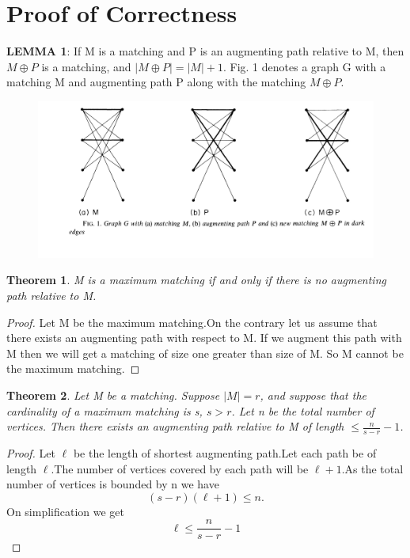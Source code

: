 \documentclass[a4paper]{report}
\newtheorem{theorem}{Theorem}[section]
\theoremstyle{definition}
\begin{document}
\section{Proof of Correctness}
\textbf{LEMMA 1}: If M is a matching and P is an augmenting path relative to M, then
$ M\oplus P$  is a matching, and $| M \oplus P | = | M | + 1 $. 
Fig. 1 denotes a graph G with a matching M and augmenting path P along with the matching $M \oplus P$.\\
\begin{figure}[h!]
\centering
\includegraphics[width=1\textwidth]{graph}\cite{hopcroft}
\end{figure}\newline
\begin{theorem}\label{name}
M is a maximum matching if and only if there is no augmenting path relative to M.
\end{theorem}
\begin{proof} Let M be the maximum matching.On the contrary let us assume that there exists an augmenting path with respect to M. If we augment this path with M then we will get a matching of size one greater than size of M. So M cannot be the maximum matching.
\end{proof}
\begin{theorem}\label{upprbndlenpath}
Let M be a matching. Suppose $|M|= r$, and suppose that the cardinality of a maximum matching is s, $s > r$. Let n be the total number of vertices. Then there exists an augmenting path
relative to M of length $\leq \frac{n}{s-r}-1$.
\end{theorem} 
\begin{proof} Let $\ell$ be the length of shortest augmenting path.Let each path be of length $\ell$.The number of vertices covered by each path will be $\ell+1$.As the total number of vertices is bounded by n we have $$(s-r)(\ell +1) \leq n.$$
On simplification we get $$\ell \leq \frac{n}{s-r}-1$$
\end{proof}
\end{document}
